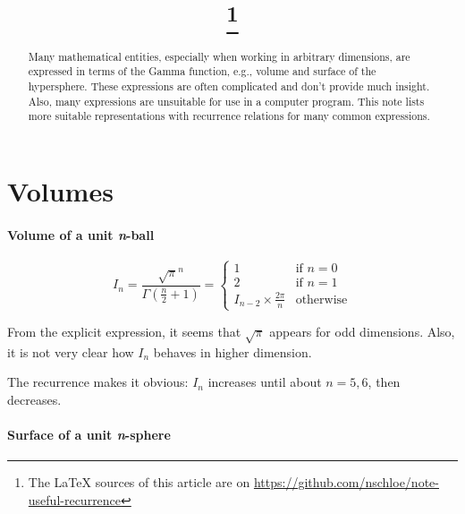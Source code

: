 \documentclass{scrartcl}
\title{\mytitle\footnote{The LaTeX sources of this article are on \url{https://github.com/nschloe/note-useful-recurrence}}}
\author{\myauthor}
\begin{document}
\maketitle
\begin{abstract}
  Many mathematical entities, especially when working in arbitrary dimensions, are
  expressed in terms of the Gamma function, e.g., volume and surface of the hypersphere.
  These expressions are often complicated and don't provide much insight. Also, many
  expressions are unsuitable for use in a computer program. This note lists more
  suitable representations with recurrence relations for many common expressions.
\end{abstract}


\section{Volumes}

\paragraph{Volume of a unit \textit{n}-ball}

\begin{equation}\label{ndimball}
  I_n
  = \frac{\sqrt{\pi}^n}{\Gamma(\frac{n}{2}+1)}
  = \begin{cases}
     1&\text{if $n = 0$}\\
     2&\text{if $n = 1$}\\
     I_{n-2} \times \frac{2\pi}{n}&\text{otherwise}
  \end{cases}
\end{equation}

From the explicit expression, it seems that $\sqrt{\pi}$ appears for odd dimensions.
Also, it is not very clear how $I_n$ behaves in higher dimension.

The recurrence makes it obvious: $I_n$ increases until about $n=5,6$, then decreases.


\paragraph{Surface of a unit \textit{n}-sphere}
\end{document}
